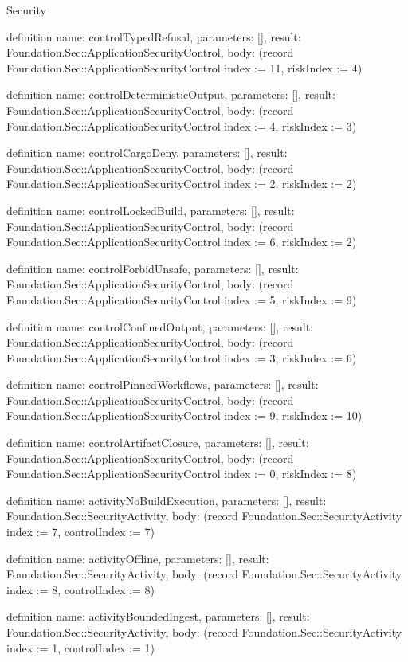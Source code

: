 \begin{lexlean}{Security}
\begin{semanticmodule}
definition{
  name: controlTypedRefusal,
  parameters: [],
  result: Foundation.Sec::ApplicationSecurityControl,
  body: (record Foundation.Sec::ApplicationSecurityControl {index := 11, riskIndex := 4})
}

definition{
  name: controlDeterministicOutput,
  parameters: [],
  result: Foundation.Sec::ApplicationSecurityControl,
  body: (record Foundation.Sec::ApplicationSecurityControl {index := 4, riskIndex := 3})
}

definition{
  name: controlCargoDeny,
  parameters: [],
  result: Foundation.Sec::ApplicationSecurityControl,
  body: (record Foundation.Sec::ApplicationSecurityControl {index := 2, riskIndex := 2})
}

definition{
  name: controlLockedBuild,
  parameters: [],
  result: Foundation.Sec::ApplicationSecurityControl,
  body: (record Foundation.Sec::ApplicationSecurityControl {index := 6, riskIndex := 2})
}

definition{
  name: controlForbidUnsafe,
  parameters: [],
  result: Foundation.Sec::ApplicationSecurityControl,
  body: (record Foundation.Sec::ApplicationSecurityControl {index := 5, riskIndex := 9})
}

definition{
  name: controlConfinedOutput,
  parameters: [],
  result: Foundation.Sec::ApplicationSecurityControl,
  body: (record Foundation.Sec::ApplicationSecurityControl {index := 3, riskIndex := 6})
}

definition{
  name: controlPinnedWorkflows,
  parameters: [],
  result: Foundation.Sec::ApplicationSecurityControl,
  body: (record Foundation.Sec::ApplicationSecurityControl {index := 9, riskIndex := 10})
}

definition{
  name: controlArtifactClosure,
  parameters: [],
  result: Foundation.Sec::ApplicationSecurityControl,
  body: (record Foundation.Sec::ApplicationSecurityControl {index := 0, riskIndex := 8})
}

definition{
  name: activityNoBuildExecution,
  parameters: [],
  result: Foundation.Sec::SecurityActivity,
  body: (record Foundation.Sec::SecurityActivity {index := 7, controlIndex := 7})
}

definition{
  name: activityOffline,
  parameters: [],
  result: Foundation.Sec::SecurityActivity,
  body: (record Foundation.Sec::SecurityActivity {index := 8, controlIndex := 8})
}

definition{
  name: activityBoundedIngest,
  parameters: [],
  result: Foundation.Sec::SecurityActivity,
  body: (record Foundation.Sec::SecurityActivity {index := 1, controlIndex := 1})
}


\end{semanticmodule}
\end{lexlean}
